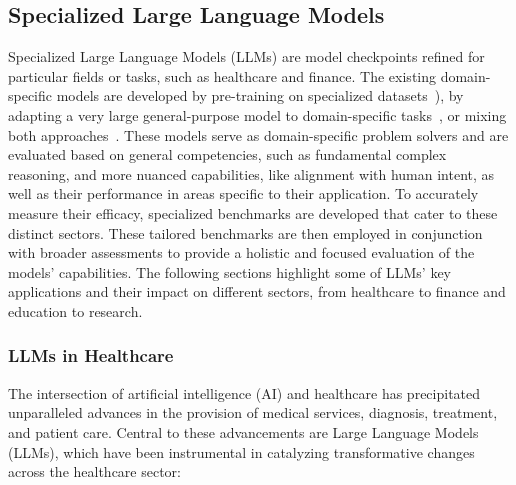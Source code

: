 \subsection{Specialized Large Language Models}
\label{subsec:applications-of-large-language-models}

Specialized Large Language Models (LLMs) are model checkpoints refined for particular fields or tasks, such as healthcare and finance.
The existing domain-specific models are developed by pre-training on specialized datasets~\cite{luo2022biogpt,bolton2023biomedlm, taylor2022galactica}), by adapting a very large general-purpose model to domain-specific tasks~\cite{singhal2022large, liang2022holistic}, or mixing both approaches~\cite{wu2023bloomberggpt}.
These models serve as domain-specific problem solvers and are evaluated based on general competencies, such as fundamental complex reasoning, and more nuanced capabilities, like alignment with human intent, as well as their performance in areas specific to their application.
To accurately measure their efficacy, specialized benchmarks are developed that cater to these distinct sectors.
These tailored benchmarks are then employed in conjunction with broader assessments to provide a holistic and focused evaluation of the models' capabilities.
The following sections highlight some of LLMs' key applications and their impact on different sectors, from healthcare to finance and education to research.

\subsubsection{LLMs in Healthcare}
\label{subsubsec:llms-in-healthcare}
The intersection of artificial intelligence (AI) and healthcare has precipitated unparalleled advances in the provision of medical services, diagnosis, treatment, and patient care.
Central to these advancements are Large Language Models (LLMs), which have been instrumental in catalyzing transformative changes across the healthcare sector:

